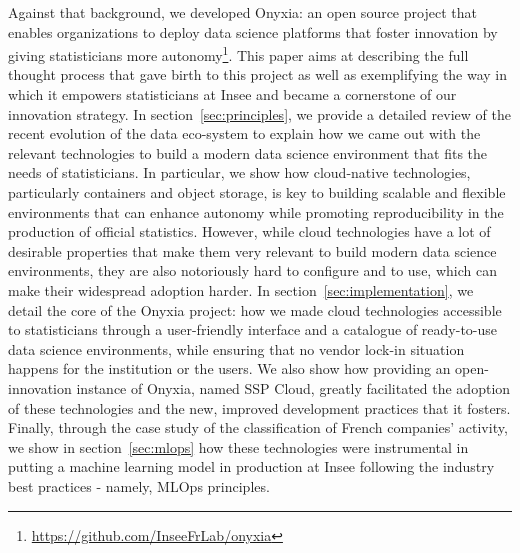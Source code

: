 Against that background, we developed Onyxia: an open source project that enables organizations to deploy data science platforms that foster innovation by giving statisticians more autonomy\footnote{\url{https://github.com/InseeFrLab/onyxia}}. This paper aims at describing the full thought process that gave birth to this project as well as exemplifying the way in which it empowers statisticians at Insee and became a cornerstone of our innovation strategy. In section~\ref{sec:principles}, we provide a detailed review of the recent evolution of the data eco-system to explain how we came out with the relevant technologies to build a modern data science environment that fits the needs of statisticians. In particular, we show how cloud-native technologies, particularly containers and object storage, is key to building scalable and flexible environments that can enhance autonomy while promoting reproducibility in the production of official statistics. However, while cloud technologies have a lot of desirable properties that make them very relevant to build modern data science environments, they are also notoriously hard to configure and to use, which can make their widespread adoption harder. In section~\ref{sec:implementation}, we detail the core of the Onyxia project: how we made cloud technologies accessible to statisticians through a user-friendly interface and a catalogue of ready-to-use data science environments, while ensuring that no vendor lock-in situation happens for the institution or the users. We also show how providing an open-innovation instance of Onyxia, named SSP Cloud, greatly facilitated the adoption of these technologies and the new, improved development practices that it fosters. Finally, through the case study of the classification of French companies' activity, we show in section~\ref{sec:mlops} how these technologies were instrumental in putting a machine learning model in production at Insee following the industry best practices - namely, MLOps principles.
